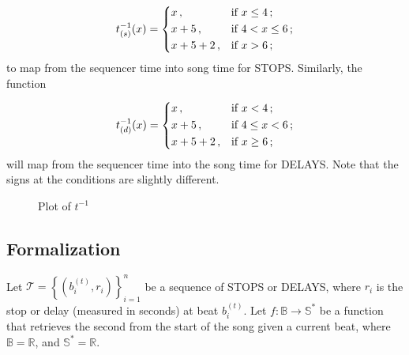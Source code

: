 \documentclass[a4paper,9pt]{article}
\begin{document}
    \begin{equation}
	    t^{-1}_{(s)}(x) =\begin{dcases}
		    x\,, &\text{if $ x \leq 4 $}\,;\\
		    x+5\,,& \text{if $ 4 < x \leq 6 $}\,;\\
		    x+5+2\,,& \text{if $ x > 6 $}\,;\\
	    \end{dcases}
	    \label{eq:tostops}
    \end{equation}
    to map from the sequencer time into song time for STOPS. Similarly, the function

    \begin{equation}
	    t^{-1}_{(d)}(x) =\begin{dcases}
		    x\,, &\text{if $ x < 4 $}\,;\\
		    x+5\,,& \text{if $ 4 \leq x < 6 $}\,;\\
		    x+5+2\,,& \text{if $ x \geq 6 $}\,;\\
	    \end{dcases}
	    \label{eq:todelays}
    \end{equation}
    will map from the sequencer time into the song time for DELAYS. Note that the signs at the conditions are slightly different.


\begin{figure}[htpb]
	\centering


\caption{Plot of $t^{-1}$ }
	\label{fig:seqtime2songtime}
\end{figure}

\subsection{Formalization}


Let $ \mathcal{T} =  \left\{\left( b_i^{(t)}, r_i \right)\right\}_{i=1}^{n} $ be a sequence of STOPS or DELAYS, where $ r_i $ is the stop or delay (measured in seconds) at beat $ b_i^{(t)} $. Let $ f:\mathbb{B}\rightarrow \mathbb{S^{*}} $ be a function that retrieves the second from the start of the song given a current beat, where $ \mathbb{B} = \mathbb{R} $, and $ \mathbb{S^{*}} = \mathbb{R}$.
\end{document}
